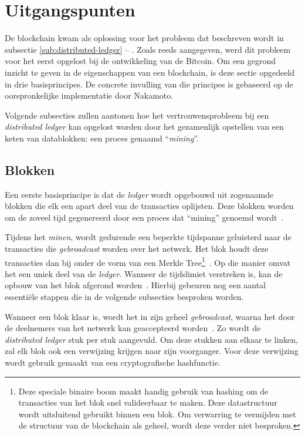 \section{Uitgangspunten}
\label{sec:uitgangspunten}

De blockchain kwam als oplossing voor het probleem dat beschreven wordt in subsectie \ref{sub:distributed-ledger} -- . Zoals reeds aangegeven, werd dit probleem voor het eerst opgelost bij de ontwikkeling van de Bitcoin. Om een gegrond inzicht te geven in de eigenschappen van een blockchain, is deze sectie opgedeeld in drie basisprincipes. De concrete invulling van die principes is gebaseerd op de oorspronkelijke implementatie door Nakamoto.

Volgende subsecties zullen aantonen hoe het vertrouwensprobleem bij een \textit{distributed ledger} kan opgelost worden door het gezamenlijk opstellen van een keten van datablokken: een proces genaamd ``\textit{mining}''.


\subsection{Blokken}
\label{sub:blokken}

Een eerste basisprincipe is dat de \textit{ledger} wordt opgebouwd uit zogenaamde blokken die elk een apart deel van de transacties oplijsten. Deze blokken worden om de zoveel tijd gegenereerd door een proces dat ``mining'' genoemd wordt~\autocite{Bhaskar2015}.

Tijdens het \textit{minen}, wordt gedurende een beperkte tijdspanne geluisterd naar de transacties die \textit{gebroadcast} worden over het netwerk. Het blok houdt deze transacties dan bij onder de vorm van een Merkle Tree\footnote{Deze speciale binaire boom maakt handig gebruik van hashing om de transacties van het blok snel valideerbaar te maken. Deze datastructuur wordt uitsluitend gebruikt binnen een blok. Om verwarring te vermijden met de structuur van de blockchain als geheel, wordt deze verder niet besproken.}~\autocite{Salem2008}. Op die manier omvat het een uniek deel van de \textit{ledger}. Wanneer de tijdslimiet verstreken is, kan de opbouw van het blok afgerond worden~\autocite{Nakamoto2008}. Hierbij gebeuren nog een aantal essentiële stappen die in de volgende subsecties besproken worden. 

Wanneer een blok klaar is, wordt het in zijn geheel \textit{gebroadcast}, waarna het door de deelnemers van het netwerk kan geaccepteerd worden~\autocite{Nakamoto2008}. Zo wordt de \textit{distributed ledger} stuk per stuk aangevuld.
Om deze stukken aan elkaar te linken, zal elk blok ook een verwijzing krijgen naar zijn voorganger. Voor deze verwijzing wordt gebruik gemaakt van een cryptografische hashfunctie. 

